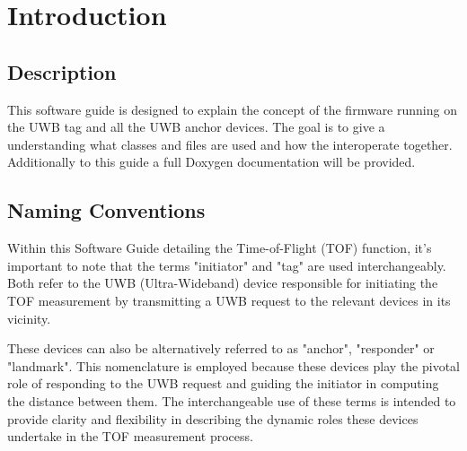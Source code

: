 \chapter{Introduction}
%
\section{Description}
This software guide is designed to explain the concept of the firmware running on the UWB tag and all the UWB anchor devices. 
The goal is to give a understanding what classes and files are used and how the interoperate together. 
Additionally to this guide a full Doxygen documentation will be provided. 
%
\section{Naming Conventions}
Within this Software Guide detailing the Time-of-Flight (TOF) function, it's important to note that the terms "initiator" and "tag" are used interchangeably. 
Both refer to the UWB (Ultra-Wideband) device responsible for initiating the TOF measurement by transmitting a UWB request to the relevant devices in its vicinity.

These devices can also be alternatively referred to as "anchor", "responder" or "landmark". This nomenclature is employed because these devices play the pivotal role of responding to the UWB request and guiding the initiator in computing the distance between them. The interchangeable use of these terms is intended to provide clarity and flexibility in describing the dynamic roles these devices undertake in the TOF measurement process.

